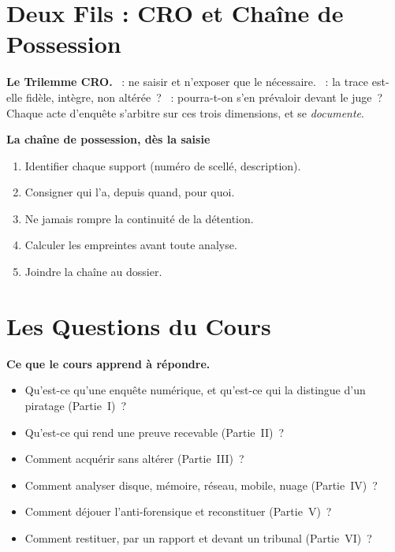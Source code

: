 \section{Deux Fils : CRO et Chaîne de Possession}
\label{sec:p00-cro}

\begin{boxCRO}
\textbf{Le Trilemme CRO.} ~: ne saisir et n'exposer
que le nécessaire. ~: la trace est-elle fidèle, intègre,
non altérée~? ~: pourra-t-on s'en prévaloir devant le
juge~? Chaque acte d'enquête s'arbitre sur ces trois dimensions, et se
\emph{documente}.
\end{boxCRO}

\begin{boxprocedure}
\textbf{La chaîne de possession, dès la saisie}
\begin{enumerate}
    \item Identifier chaque support (numéro de scellé, description).
    \item Consigner qui l'a, depuis quand, pour quoi.
    \item Ne jamais rompre la continuité de la détention.
    \item Calculer les empreintes avant toute analyse.
    \item Joindre la chaîne au dossier.
\end{enumerate}
\end{boxprocedure}

\section{Les Questions du Cours}
\label{sec:p00-questions}

\begin{boxinfo}
\textbf{Ce que le cours apprend à répondre.}
\begin{itemize}
    \item Qu'est-ce qu'une enquête numérique, et qu'est-ce qui la distingue
          d'un piratage (Partie~I)~?
    \item Qu'est-ce qui rend une preuve recevable (Partie~II)~?
    \item Comment acquérir sans altérer (Partie~III)~?
    \item Comment analyser disque, mémoire, réseau, mobile, nuage
          (Partie~IV)~?
    \item Comment déjouer l'anti-forensique et reconstituer (Partie~V)~?
    \item Comment restituer, par un rapport et devant un tribunal
          (Partie~VI)~?
\end{itemize}
\end{boxinfo}

